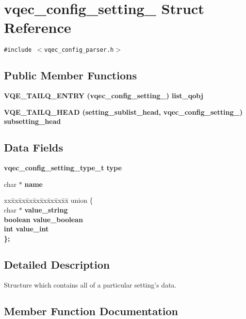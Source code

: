 \section{vqec\_\-config\_\-setting\_\- Struct Reference}
\label{structvqec__config__setting__}
{\tt \#include $<$vqec\_\-config\_\-parser.h$>$}

\subsection*{Public Member Functions}
\begin{CompactItemize}
\item 
\bf{VQE\_\-TAILQ\_\-ENTRY} (\bf{vqec\_\-config\_\-setting\_\-}) list\_\-qobj
\item 
\bf{VQE\_\-TAILQ\_\-HEAD} (setting\_\-sublist\_\-head, \bf{vqec\_\-config\_\-setting\_\-}) subsetting\_\-head
\end{CompactItemize}
\subsection*{Data Fields}
\begin{CompactItemize}
\item 
\bf{vqec\_\-config\_\-setting\_\-type\_\-t} \bf{type}
\item 
char $\ast$ \bf{name}
\item 
\begin{tabbing}
xx\=xx\=xx\=xx\=xx\=xx\=xx\=xx\=xx\=\kill
union \{\\
\>char $\ast$ \bf{value\_string}\\
\>boolean \bf{value\_boolean}\\
\>int \bf{value\_int}\\
\}; \\

\end{tabbing}\end{CompactItemize}


\subsection{Detailed Description}
Structure which contains all of a particular setting's data. 



\subsection{Member Function Documentation}
